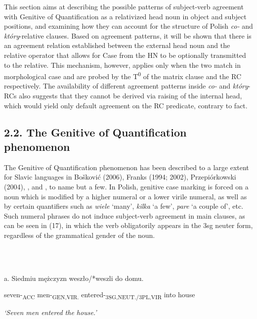 \documentclass[output=paper]{langsci/langscibook}
\begin{document}
\begin{styleListParagraph}
This section aims at describing the possible patterns of subject-verb agreement with Genitive of Quantification as a relativized head noun in object and subject positions, and examining how they can account for the structure of Polish \textit{co{}-} and \textit{który}{}-relative clauses. Based on agreement patterns, it will be shown that there is an agreement relation established between the external head noun and the relative operator that allows for Case from the HN to be optionally transmitted to the relative. This mechanism, however, applies only when the two match in morphological case and are probed by the T\textsuperscript{0} of the matrix clause and the RC respectively. The availability of different agreement patterns inside \textit{co{}-} and \textit{który}{}-RCs also suggests that they cannot be derived via raising of the internal head, which would yield only default agreement on the RC predicate, contrary to fact. 
\end{styleListParagraph}

\subsection{ 2.2. The Genitive of Quantification phenomenon}

The Genitive of Quantification phenomenon has been described to a large extent for Slavic languages in Bošković (2006), Franks (1994; 2002), Przepiórkowski (2004), \citet{Rutkowski2002}, and \citet{Willim2003}, to name but a few. In Polish, genitive case marking is forced on a noun which is modified by a higher numeral or a lower virile numeral, as well as by certain quantifiers such as \textit{wiele} ‘many’, \textit{kilka} ‘a few’, \textit{pare} ‘a couple of’, etc. Such numeral phrases do not induce subject-verb agreement in main clauses, as can be seen in (17), in which the verb obligatorily appears in the 3sg neuter form, regardless of the grammatical gender of the noun. 

\ea%
    \label{ex:key:17}
    \gll\\
        \\
    \glt
    \z

          a.   Siedmiu   mężczyzn   weszło/*weszli   do   domu.

    seven-\textsubscript{ACC}   men-\textsubscript{GEN,VIR.}   entered-\textsubscript{3SG,NEUT./3PL,VIR} into   house

 \textit{‘Seven men entered the house.’}
\end{document}
